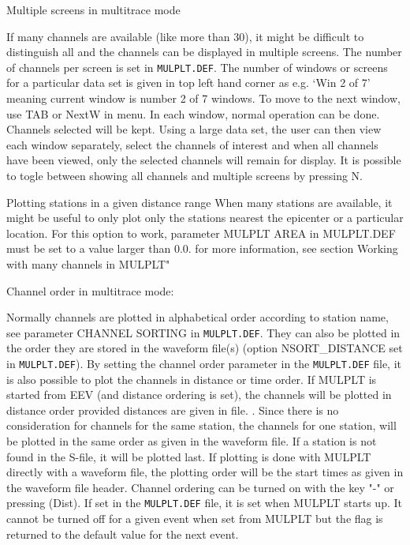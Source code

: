 Multiple screens in multitrace mode 

If many channels are available (like more than 30), it might be difficult to distinguish all and the channels can be displayed in multiple screens. The number of channels per screen is set in \texttt{MULPLT.DEF}. The number of windows or screens for a particular data set is given in top left hand corner as e.g. `Win 2 of 7' meaning current window is number 2 of 7 windows. To move to the next window, use TAB or NextW in menu. In each window, normal operation can be done. Channels selected will be kept. Using a large data set, the user can then view each window separately, select the channels of interest and when all channels have been viewed, only the selected channels will remain for display.
It is possible to togle between showing all channels and multiple screens by pressing N.  


Plotting stations in a given distance range
When many stations are available, it might be useful to only plot only the stations nearest the epicenter or a particular location. For this option to work, parameter MULPLT AREA in  MULPLT.DEF must be set to a value larger than 0.0.  for more information, see section Working with many channels in MULPLT"


Channel order in multitrace mode: 

Normally channels are plotted in alphabetical order according to station name, see parameter CHANNEL SORTING in \texttt{MULPLT.DEF}. They can also be plotted in the order they are stored in the waveform file(s) (option NSORT\_DISTANCE set in \texttt{MULPLT.DEF}). By setting the channel order parameter in the \texttt{MULPLT.DEF} file, it is also possible to plot the channels in distance or time order. If MULPLT is started from EEV (and distance ordering is set), the channels will be plotted 
in distance order provided distances are given in file. 
. 
Since there is no consideration for channels for the same station, the channels for one station, will be plotted in the same order as given in the waveform file. If a station is not found in the S-file, it will be plotted last. If plotting is done with MULPLT directly with a waveform file, the plotting order will be the start times as given in the waveform file header. Channel ordering can be turned on with the key "-" or pressing (Dist). If set in the \texttt{MULPLT.DEF} file, it 
is set when MULPLT starts up. It cannot be turned off for a given event when set from MULPLT but the flag is returned to the default value for the next event. 


